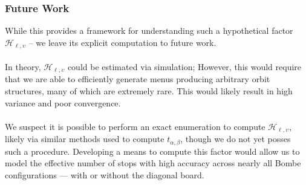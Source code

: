 \subsubsection{Future Work} While this provides a framework for
understanding such a hypothetical factor $\mathcal{H}_{\ell,\upsilon}$ -- we
leave its explicit computation to future work.
\\\\In theory, $\mathcal{H}_{\ell,\upsilon}$ could be estimated via simulation;
However, this would require that we are able to efficiently generate
menus producing arbitrary orbit structures, many of which are
extremely rare. This would likely result in high variance and poor convergence.
\\\\We suspect it is possible to perform an exact enumeration to
compute $\mathcal{H}_{\ell,\upsilon}$, likely via similar methods used to
compute $t_{\alpha,\beta}$, though we do not yet posses such a
procedure. Developing a means to compute this factor would allow us
to model the effective number of stops with high accuracy across
nearly all Bombe configurations — with or without the diagonal board.

